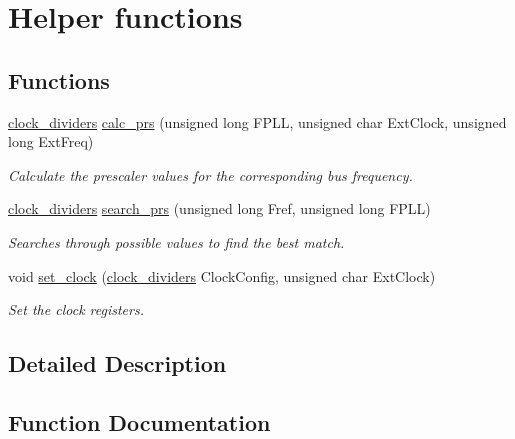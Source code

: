 \hypertarget{group__helper_c_p_m_u}{}\section{Helper functions}
\label{group__helper_c_p_m_u}
\subsection*{Functions}
\begin{DoxyCompactItemize}
\item 
\hyperlink{structclock__dividers}{clock\+\_\+dividers} \hyperlink{group__helper_c_p_m_u_gab1ca661150fc5676794ddf0cca50ce8d}{calc\+\_\+prs} (unsigned long F\+P\+L\+L, unsigned char Ext\+Clock, unsigned long Ext\+Freq)
\begin{DoxyCompactList}\small\item\em Calculate the prescaler values for the corresponding bus frequency. \end{DoxyCompactList}\item 
\hyperlink{structclock__dividers}{clock\+\_\+dividers} \hyperlink{group__helper_c_p_m_u_gadfb20c94648c619f69d32ed3920faed0}{search\+\_\+prs} (unsigned long Fref, unsigned long F\+P\+L\+L)
\begin{DoxyCompactList}\small\item\em Searches through possible values to find the best match. \end{DoxyCompactList}\item 
void \hyperlink{group__helper_c_p_m_u_ga97250687e8ce6c1f1c893c93766afe1c}{set\+\_\+clock} (\hyperlink{structclock__dividers}{clock\+\_\+dividers} Clock\+Config, unsigned char Ext\+Clock)
\begin{DoxyCompactList}\small\item\em Set the clock registers. \end{DoxyCompactList}\end{DoxyCompactItemize}


\subsection{Detailed Description}


\subsection{Function Documentation}
\hypertarget{group__helper_c_p_m_u_gab1ca661150fc5676794ddf0cca50ce8d}{}
